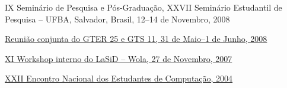 \documentclass[10pt]{article}
\begin{document}
\begin{innerlist}
    \item IX Seminário de Pesquisa e Pós-Graduação, XXVII Seminário Estudantil de Pesquisa -- UFBA, Salvador, Brasil, 12--14 de Novembro, 2008

    \item \href{https://gts.nic.br/reunioes/gts-11}{Reunião conjunta do GTER 25 e GTS 11, 31 de Maio--1 de Junho, 2008}

    \item \href{http://listas.dcc.ufba.br/pipermail/estudantes-comp/2007-November/003076.html}{XI Workshop interno do LaSiD -- Wola, 27 de Novembro, 2007}

    \item \href{http://wiki.enec.org.br/ENECOMP2004}{XXII Encontro Nacional dos Estudantes de Computação, 2004}

\end{innerlist}
\end{document}
